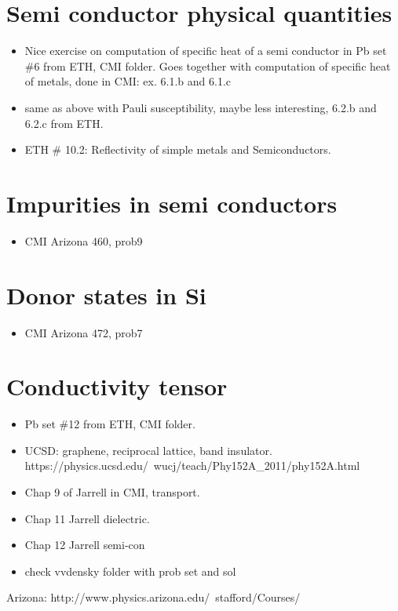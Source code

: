 \section{Semi conductor physical quantities}

\begin{itemize}
\item Nice exercise on computation of specific heat of a semi
  conductor in Pb set \#6 from ETH, CMI folder. Goes together with
  computation of specific heat of metals, done in CMI: ex. 6.1.b and
  6.1.c
\item same as above with Pauli susceptibility, maybe less interesting,
  6.2.b and 6.2.c from ETH.
\item ETH \# 10.2: Reflectivity of simple metals and Semiconductors.
\end{itemize}

\section{Impurities in semi conductors}

\begin{itemize}
\item CMI Arizona 460, prob9
\end{itemize}

\section{Donor states in Si}

\begin{itemize}
\item CMI Arizona 472, prob7
\end{itemize}


\section{Conductivity tensor}

\begin{itemize}
\item Pb set \#12 from ETH, CMI folder.
\item UCSD: graphene, reciprocal lattice, band
  insulator. https://physics.ucsd.edu/~wucj/teach/Phy152A_2011/phy152A.html
\item Chap 9 of Jarrell in CMI, transport.
\item Chap 11 Jarrell dielectric.
\item Chap 12 Jarrell semi-con
\item check vvdensky folder with prob set and sol
\end{itemize}

Arizona: http://www.physics.arizona.edu/~stafford/Courses/



